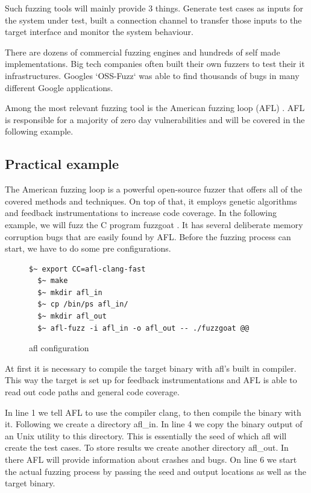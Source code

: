 \documentclass[journal=tosc,final]{iacrtrans}
\begin{document}
Such fuzzing tools will mainly provide 3 things. Generate test cases as inputs for the system under test, built a connection channel to transfer those inputs to the target interface and monitor the system behaviour.

There are dozens of commercial fuzzing engines and hundreds of self made implementations. Big tech companies often built their own fuzzers to test their it infrastructures. Googles `OSS-Fuzz` was able to find thousands of bugs in many different Google applications. 

Among the most relevant fuzzing tool is the American fuzzing loop (AFL) \cite{afl}.
AFL is responsible for a majority of zero day vulnerabilities and will be covered in the following example.
\subsection{Practical example}
The American fuzzing loop is a powerful open-source fuzzer that offers all of the covered methods and techniques. On top of that, it employs genetic algorithms and feedback instrumentations to increase code coverage. In the following example, we will fuzz the C program fuzzgoat \cite{goat}. It has several deliberate memory corruption bugs that are easily found by AFL. Before the fuzzing process can start, we have to do some pre configurations. 
\begin{figure}[h]
 \caption{afl configuration}
 \begin{lstlisting}[style=code]
  $~ export CC=afl-clang-fast
  $~ make
  $~ mkdir afl_in
  $~ cp /bin/ps afl_in/   
  $~ mkdir afl_out
  $~ afl-fuzz -i afl_in -o afl_out -- ./fuzzgoat @@
\end{lstlisting}
\end{figure}

At first it is necessary to compile the target binary with afl's built in compiler. This way the target is set up for feedback instrumentations and AFL is able to read out code paths and general code coverage.

In line 1 we tell AFL to use the compiler clang, to then compile the binary with it.
Following we create a directory afl\_in. In line 4 we copy the binary output of an Unix utility to this directory. This is essentially the seed of which afl will create the test cases. To store results we create another directory afl\_out. In there AFL will provide information about crashes and bugs. 
On line 6 we start the actual fuzzing process by passing the seed and output locations as well as the target binary. 
\end{document}
